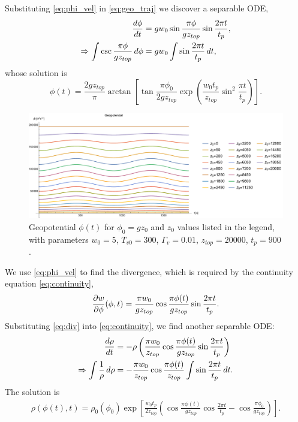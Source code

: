 Substituting \eqref{eq:phi_vel} in \eqref{eq:geo_traj} we discover a separable ODE,
\begin{align}
  \frac{ d \phi}{d t} &= gw_0\sin\frac{\pi \phi}{g z_{top}}\sin\frac{2\pi t}{t_p},\\
  \Rightarrow \int \csc\frac{\pi \phi}{g z_{top}}\,d\phi &= g w_0\int\sin\frac{2\pi t}{t_p}\,dt,
\end{align}
whose solution is
\begin{equation}\label{eq:phi_sol}
\phi(t) = \frac{2gz_{top}}{\pi}\arctan\left[\tan\frac{\pi \phi_0}{2g z_{top}}\exp\left(\frac{w_0t_p}{z_{top}} \sin^2 \frac{\pi t}{t_p}\right)\right].
  \end{equation}

\begin{figure}[H]
  \centering
  \includegraphics[width=\linewidth]{figures/geopotential_plot}
  \caption{Geopotential $\phi(t)$ for $\phi_0 = gz_0$ and $z_0$ values listed in the legend, with parameters $w_0=5$, $T_{v0}=300$, $\Gamma_v=0.01$, $z_{top}=20000$, $t_p=900$.}\label{fig:geopotential}
\end{figure}

We use \eqref{eq:phi_vel} to find the divergence, which is required by the continuity equation \eqref{eq:continuity},
\begin{equation}\label{eq:div}
  \frac{\partial w }{\partial \phi}(\phi,t) = \frac{\pi w_0}{g z_{top}}\cos\frac{\pi \phi(t)}{gz_{top}}\sin\frac{2\pi t}{t_p}.
\end{equation}
Substituting \eqref{eq:div} into \eqref{eq:continuity}, we find another separable ODE:
\begin{align*}
  \frac{ d \rho}{d t} &= -\rho \left(\frac{\pi w_0}{z_{top}}\cos\frac{\pi \phi(t)}{g z_{top}}\sin\frac{2\pi t}{t_p}\right)\\
  \Rightarrow \int \frac{1}{\rho}\,d\rho &= -\frac{\pi w_0}{z_{top}}\cos\frac{\pi \phi(t)}{z_{top}}\int \sin \frac{2\pi t}{t_p}\,dt.
\end{align*}
The solution is
\begin{align}\label{eq:density}
  \rho(\phi(t),t) = \rho_0(\phi_0)\exp\left[\frac{ w_0 t_p}{2z_{top}}\left(\cos\frac{\pi {\phi}(t)}{gz_{top}}\cos\frac{2\pi t}{t_p}-\cos\frac{\pi {\phi_0}}{gz_{top}}\right)\right].
\end{align} 

